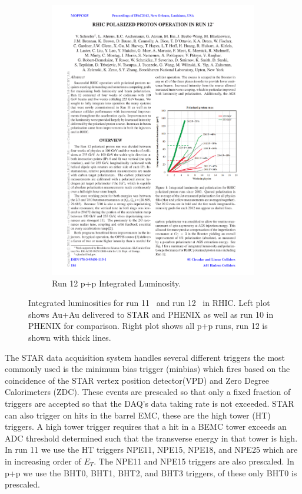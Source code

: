 \begin{figure}[htbp]
\begin{subfigure}{0.5\textwidth}
        \includegraphics[width=\textwidth]{Plots/NPE/Run12_Lum.pdf}
        \caption{Run 12 p+p Integrated Luminosity.}
        \label{fig:Lumb}
    \end{subfigure}
\caption[RHIC Integrated Luminosities in Run11 and Run12]{Integrated luminosities for run 11~\cite{RHIC2011} and run 12~\cite{RHIC2012} in RHIC. Left plot shows Au+Au delivered to STAR and PHENIX as well as run 10 in PHENIX for comparison. Right plot shows all p+p runs, run 12 is shown with thick lines.}
\label{fig:RunLum}
\end{figure}

The STAR data acquisition system handles several different triggers the most commonly used is the minimum bias trigger (minbias) which fires based on the coincidence of the STAR vertex position detector(VPD) and Zero Degree Calorimeters (ZDC). These events are prescaled so that only a fixed fraction of triggers are accepted so that the DAQ's data taking rate is not exceeded. STAR can also trigger on hits in the barrel EMC, these are the high tower (HT) triggers. A high tower trigger requires that a hit in a BEMC tower exceeds an ADC threshold determined such that the transverse energy in that tower is high. In run 11 we use the HT triggers NPE11, NPE15, NPE18, and NPE25 which are in increasing order of $E_{T}$. The NPE11 and NPE15 triggers are also prescaled. In p+p we use the BHT0, BHT1, BHT2, and BHT3 triggers, of these only BHT0 is prescaled.

